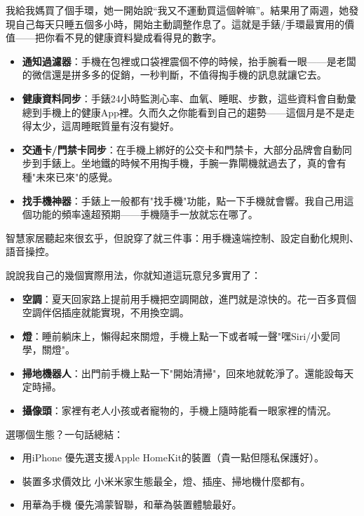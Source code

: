 
我給我媽買了個手環，她一開始說“我又不運動買這個幹嘛”。結果用了兩週，她發現自己每天只睡五個多小時，開始主動調整作息了。這就是手錶/手環最實用的價值——把你看不見的健康資料變成看得見的數字。

\begin{itemize}
  \item \textbf{通知過濾器}：手機在包裡或口袋裡震個不停的時候，抬手腕看一眼——是老闆的微信還是拼多多的促銷，一秒判斷，不值得掏手機的訊息就讓它去。
  \item \textbf{健康資料同步}：手錶24小時監測心率、血氧、睡眠、步數，這些資料會自動彙總到手機上的健康App裡。久而久之你能看到自己的趨勢——這個月是不是走得太少，這周睡眠質量有沒有變好。
  \item \textbf{交通卡/門禁卡同步}：在手機上綁好的公交卡和門禁卡，大部分品牌會自動同步到手錶上。坐地鐵的時候不用掏手機，手腕一靠閘機就過去了，真的會有種"未來已來"的感覺。
  \item \textbf{找手機神器}：手錶上一般都有"找手機"功能，點一下手機就會響。我自己用這個功能的頻率遠超預期——手機隨手一放就忘在哪了。
\end{itemize}


智慧家居聽起來很玄乎，但說穿了就三件事：用手機遠端控制、設定自動化規則、語音操控。

說說我自己的幾個實際用法，你就知道這玩意兒多實用了：

\begin{itemize}
  \item \textbf{空調}：夏天回家路上提前用手機把空調開啟，進門就是涼快的。花一百多買個空調伴侶插座就能實現，不用換空調。
  \item \textbf{燈}：睡前躺床上，懶得起來關燈，手機上點一下或者喊一聲"嘿Siri/小愛同學，關燈"。
  \item \textbf{掃地機器人}：出門前手機上點一下"開始清掃"，回來地就乾淨了。還能設每天定時掃。
  \item \textbf{攝像頭}：家裡有老人小孩或者寵物的，手機上隨時能看一眼家裡的情況。
\end{itemize}

選哪個生態？一句話總結：

\begin{itemize}
  \item 用iPhone 優先選支援Apple HomeKit的裝置（貴一點但隱私保護好）。
  \item 裝置多求價效比 小米米家生態最全，燈、插座、掃地機什麼都有。
  \item 用華為手機 優先鴻蒙智聯，和華為裝置體驗最好。
\end{itemize}

